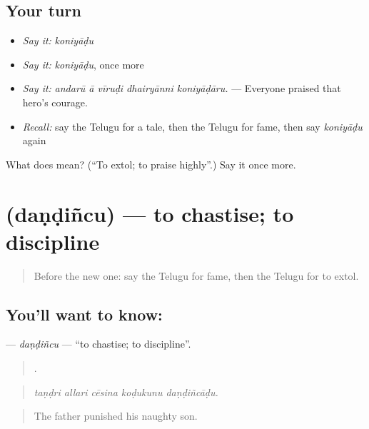 \subsection*{Your turn}
\begin{itemize}
\raggedright
  \item \emph{Say it:} \emph{koniyāḍu}
  \item \emph{Say it:} \emph{koniyāḍu}, once more
  \item \emph{Say it:} \emph{andarū ā vīruḍi dhairyānni koniyāḍāru.} — Everyone praised that hero's courage.
  \item \emph{Recall:} say the Telugu for a tale, then the Telugu for fame, then say \emph{koniyāḍu} again
\end{itemize}

\begin{tcolorbox}[breakable,colback=teal!4,colframe=teal!35!black,title={Before you move on}]
What does  mean? (\textquotedblleft{}To extol; to praise highly\textquotedblright{}.) Say it once more.
\end{tcolorbox}
\section[\texorpdfstring{\te{దండించు} (daṇḍiñcu)}{దండించు (daṇḍiñcu)}]{ (daṇḍiñcu) — to chastise; to discipline}

\label{lesson:TE-C370-dandincu}



\begin{quote}
Before the new one: say the Telugu for fame, then the Telugu for to extol.
\end{quote}

\subsection*{You'll want to know: }
\textbf{} — \emph{daṇḍiñcu} — \textquotedblleft{}to chastise; to discipline\textquotedblright{}.

\begin{quote}
    .
\end{quote}

\begin{quote}
\emph{taṇḍri allari cēsina koḍukunu daṇḍiñcāḍu.}
\end{quote}

\begin{quote}
The father punished his naughty son.
\end{quote}

